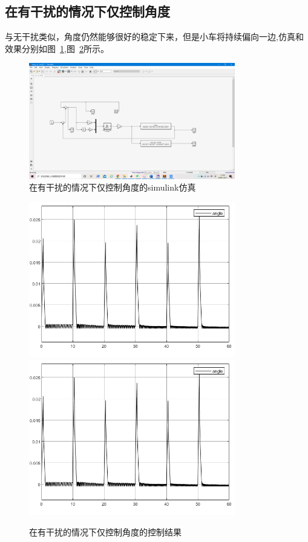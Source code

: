 \subsection{在有干扰的情况下仅控制角度}
与无干扰类似，角度仍然能够很好的稳定下来，但是小车将持续偏向一边,仿真和效果分别如图~\ref{fig:disturbsim},图~\ref{fig:disturb}所示。

\begin{figure}[hbpt]
\centering
\includegraphics[width=9cm]{dis1.png}

\caption{在有干扰的情况下仅控制角度的simulink仿真}\label{fig:disturbsim}
\end{figure}


\begin{figure}[hbpt]
\centering

\includegraphics[width=9cm]{dis2.png}
\includegraphics[width=9cm]{dis2.png}
\caption{在有干扰的情况下仅控制角度的控制结果}\label{fig:disturb}
\end{figure}

